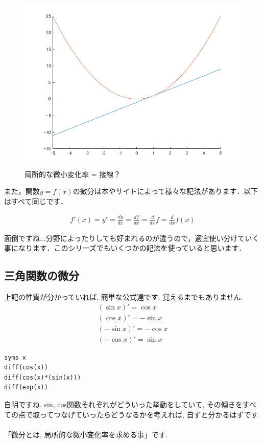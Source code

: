 \documentclass[11pt,a4paper,uplatex]{ujreport}
\begin{document}
\begin{figure}[H]
\label{im:sessen}
  \centering
  \includegraphics[width=120mm,bb=0 0 700 525]{../figures/sessen.png}
  \caption{局所的な微小変化率 = 接線？}
\end{figure}

また，関数$y=f(x)$の微分は本やサイトによって様々な記法があります．以下はすべて同じです．

\begin{eqnarray}
f'(x) = y' = \frac{dy}{dx} = \frac{df}{dx} = \frac{d}{dx}f = \frac{d}{dx}f(x)\nonumber
\end{eqnarray}

面倒ですね...分野によったりしても好まれるのが違うので，適宜使い分けていく事になります．このシリーズでもいくつかの記法を使っていると思います．
\subsection{三角関数の微分}
上記の性質が分かっていれば, 簡単な公式達です. 覚えるまでもありません.
\begin{eqnarray}
(\sin x)' = \cos x \\
(\cos x)' = -\sin x \\
(-\sin x)' = -\cos x \\
(-\cos x)' = \sin x
\end{eqnarray}

\begin{lstlisting}[caption=いろんな微分,label=sc:diff]
syms x
diff(cos(x))
diff(cos(x)*(sin(x)))
diff(exp(x))
\end{lstlisting}
自明ですね. sin, cos関数それぞれがどういった挙動をしていて, その傾きをすべての点で取ってつなげていったらどうなるかを考えれば, 自ずと分かるはずです.\\
\\
「微分とは, 局所的な微小変化率を求める事」です.\\
\end{document}
